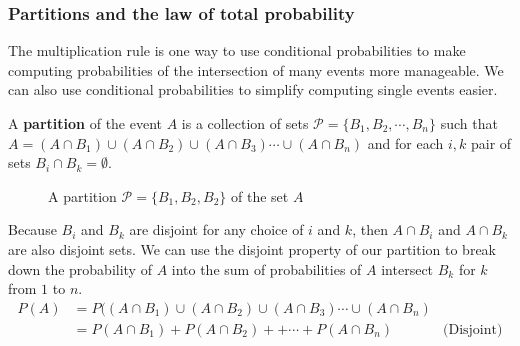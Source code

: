 \clearpage
\subsubsection{Partitions and the law of total probability}

The multiplication rule is one way to use conditional probabilities to make computing probabilities of the intersection of many events more manageable.
We can also use conditional probabilities to simplify computing single events easier.

A \textbf{partition} of the event $A$ is a collection of sets $\mathcal{P} = \{B_{1}, B_{2}, \cdots, B_{n}\}$ such that $A = \left(A \cap B_{1}\right) \cup  \left(A \cap B_{2}\right)  \cup  \left(A \cap B_{3}\right) \cdots  \cup  \left(A \cap B_{n}\right)$ and for each $i,k$ pair of sets $B_{i} \cap B_{k} = \emptyset$.

\begin{figure}[ht!]
    \centering
    \caption{A partition $\mathcal{P} = \{B_{1},B_{2},B_{2}\}$ of the set $A$\label{fig.partition}}
\end{figure}


Because $B_{i}$ and $B_{k}$ are disjoint for any choice of $i$ and $k$, then $A \cap B_{i}$ and $A \cap B_{k}$ are also disjoint sets.
We can use the disjoint property of our partition to break down the probability of $A$ into the sum of probabilities of $A$ intersect $B_{k}$ for $k$ from $1$ to $n$.
\begin{align}
    P(A) &= P(\left(A \cap B_{1}\right) \cup  \left(A \cap B_{2}\right)  \cup  \left(A \cap B_{3}\right) \cdots  \cup  \left(A \cap B_{n}\right) \\
    &= P\left(A \cap B_{1}\right) +  P\left(A \cap B_{2}\right) +     + \cdots  +  P\left(A \cap B_{n}\right)  & \text{(Disjoint)}
\end{align}

